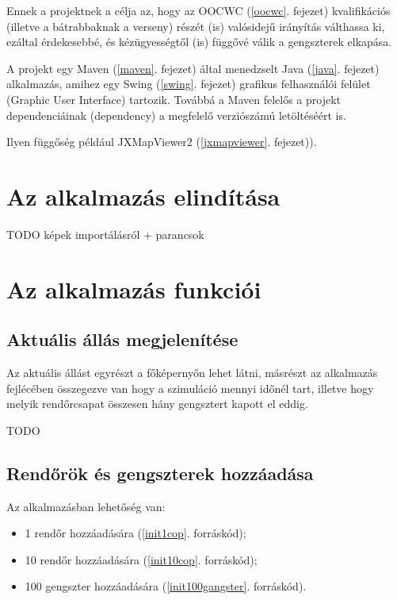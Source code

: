 \documentclass[a4paper,12pt]{report}
\begin{document}
Ennek a projektnek a célja az, hogy az OOCWC (\ref{oocwc}. fejezet) kvalifikációs (illetve a bátrabbaknak a verseny) részét (is) valósidejű irányítás válthassa ki, ezáltal érdekesebbé, és kézügyességtől (is) függővé válik a gengszterek elkapása.

\vspace{2mm}
A projekt egy Maven (\ref{maven}. fejezet) által menedzselt Java (\ref{java}. fejezet) alkalmazás, amihez egy Swing (\ref{swing}. fejezet) grafikus felhasználói felület (Graphic User Interface) tartozik. Továbbá a Maven felelős a projekt dependenciáinak (dependency) a megfelelő verziószámú letöltéséért is. 

\vspace{2mm}
Ilyen függőség például JXMapViewer2 \cite{jxmapv} (\ref{jxmapviewer}. fejezet)).


\section{Az alkalmazás elindítása}
\label{howtorun}

TODO képek importálásról + parancsok

\section{Az alkalmazás funkciói}
\label{functions}


\subsection{Aktuális állás megjelenítése}
\label{actualstate}

Az aktuális állást egyrészt a főképernyőn lehet látni, másrészt az alkalmazás fejlécében összegezve van hogy a szimuláció mennyi időnél tart, illetve hogy melyik rendőrcsapat összesen hány gengsztert kapott el eddig.

TODO

\subsection{Rendőrök és gengszterek hozzáadása}
\label{addcops}

Az alkalmazásban lehetőség van:

\begin{itemize}
\item 1 rendőr hozzáadására (\ref{init1cop}. forráskód);
\item 10 rendőr hozzáadására (\ref{init10cop}. forráskód);
\item 100 gengszter hozzáadására (\ref{init100gangster}. forráskód).
\end{itemize}
\end{document}
